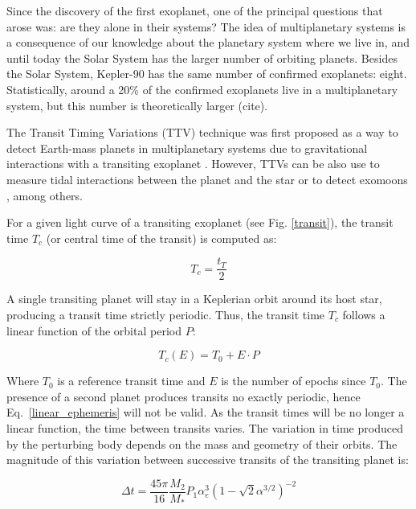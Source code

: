 Since the discovery of the first exoplanet, one of the principal questions that arose was: are they alone in their systems? The idea of multiplanetary systems is a consequence of our knowledge about the planetary system where we live in, and until today the Solar System has the larger number of orbiting planets. Besides the Solar System, Kepler-90 has the same number of confirmed exoplanets: eight. Statistically, around a 20\% of the confirmed exoplanets live in a multiplanetary system, but this number is theoretically larger (cite). 

The Transit Timing Variations (TTV) technique was first proposed as a way to detect Earth-mass planets in multiplanetary systems due to gravitational interactions with a transiting exoplanet \citep{Holman2005,Agol2005}. However, TTVs can be also use to measure tidal interactions between the planet and the star or to detect exomoons \citep{Kipping2009a,Kipping2009b}, among others. 

For a given light curve of a transiting exoplanet (see Fig. \ref{transit}), the transit time $T_{c}$ (or central time of the transit) is computed as:

\begin{equation}
T_{c} = \frac{t_T}{2}
\end{equation}

A single transiting planet will stay in a Keplerian orbit around its host star, producing a transit time strictly periodic. Thus, the transit time $T_c$ follows a linear function of the orbital period $P$: 

\begin{equation}
T_{c}(E) = T_{0} + E \cdot P
\label{linear_ephemeris} 
\end{equation}

Where $T_0$ is a reference transit time and $E$ is the number of epochs since $T_0$.  The presence of a second planet produces transits no exactly periodic, hence Eq.~\ref{linear_ephemeris} will not be valid. As the transit times will be no longer a linear function,  the time between  transits varies.  The variation in time produced by the perturbing body depends on the mass and geometry of their orbits. The magnitude of this variation between successive transits of the transiting planet is:

\begin{equation}
\Delta t = \frac{45\pi}{16} \frac{M_2}{M_*} P_{1} \alpha^3_{e} (1-	\sqrt{2}\alpha^{3/2})^{-2}
\label{delta_t}
\end{equation}

